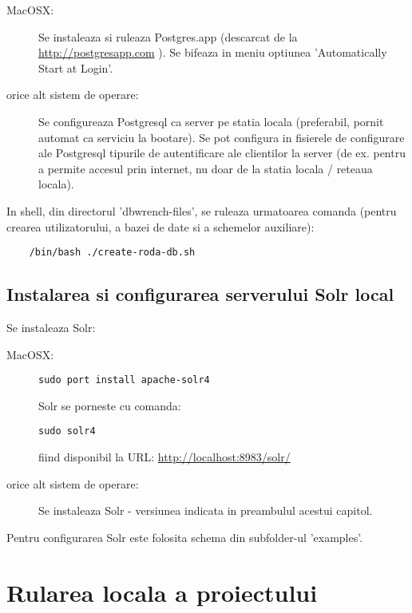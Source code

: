 \begin{description}
\item[MacOSX:]

Se instaleaza si ruleaza Postgres.app (descarcat de la \url{http://postgresapp.com} ).
Se bifeaza in meniu optiunea 'Automatically Start at Login'.

\item[orice alt sistem de operare:]

Se configureaza Postgresql ca server pe statia locala 
(preferabil, pornit automat ca serviciu la bootare). 
Se pot configura in fisierele de configurare ale Postgresql tipurile de autentificare ale clientilor la server 
(de ex. pentru a permite accesul prin
internet, nu doar de la statia locala / reteaua locala).
\end{description}

In shell, din directorul 'dbwrench-files', 
se ruleaza urmatoarea comanda
(pentru crearea utilizatorului, a bazei de date si a schemelor auxiliare):
\begin{lstlisting}
	/bin/bash ./create-roda-db.sh
\end{lstlisting}

\subsection{Instalarea si configurarea serverului Solr local}
\label{solr_configurare}

Se instaleaza Solr:
\begin{description}
\item[MacOSX:]
\begin{lstlisting}[breaklines=true]
	sudo port install apache-solr4
\end{lstlisting}
Solr se porneste cu comanda:
\begin{lstlisting}[breaklines=true]
	sudo solr4
\end{lstlisting}
fiind disponibil la URL: \url{http://localhost:8983/solr/}

\item[orice alt sistem de operare:]

Se instaleaza Solr - versiunea indicata in preambulul acestui capitol.
\end{description}

Pentru configurarea Solr este folosita schema din subfolder-ul 'examples'. 

\section{Rularea locala a proiectului}

